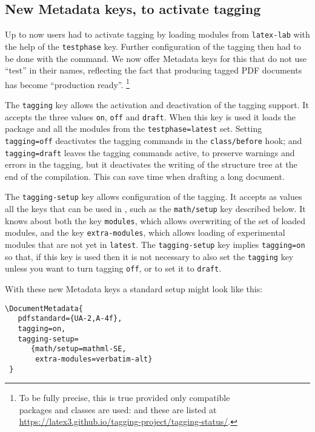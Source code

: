 \documentclass{ltnews}
\begin{document}
\subsection{New Metadata keys, to activate tagging}

Up to now users had to activate tagging by loading modules from
\texttt{latex-lab} with the help of the \texttt{testphase}
key. Further configuration of the tagging then had to be done with the
 command.  We now offer Metadata keys for this 
that do not use
\enquote{test} in their names, reflecting the fact that producing
tagged PDF documents has become \enquote{production ready}.%
\footnote{To be fully precise, this is true provided
only compatible\\
packages and classes are used: and these are listed at\\
\url{https://latex3.github.io/tagging-project/tagging-status/}.}

The \texttt{tagging} key allows the activation and deactivation of the tagging
support.  It accepts the three values \texttt{on}, \texttt{off} and
\texttt{draft}.  When this key is used it loads the
 package and all the modules from the
\texttt{testphase=latest} set.  Setting \texttt{tagging=off} deactivates the
tagging commands in the 
\texttt{class/before} hook; and \texttt{tagging=draft} leaves the 
tagging commands active, to 
preserve warnings and errors in the tagging, but it deactivates
the writing of the structure tree at the end of the compilation. This
can save time when drafting a long document.

The \texttt{tagging-setup} key allows configuration of the tagging. It
accepts as values all the keys that can be used in ,
such as the \texttt{math/setup} key described below. It knows about both the
key \texttt{modules}, which allows overwriting of the set of loaded
modules, and the key \texttt{extra-modules}, which allows loading of
experimental modules that are not yet in \texttt{latest}. 
%
The \texttt{tagging-setup} key implies \texttt{tagging=on} so that, if
this key is used then it is not necessary to also set the \texttt{tagging}
key unless you want to turn tagging \texttt{off}, or to set it to
\texttt{draft}.

With these new Metadata keys a standard setup might look like this:
\begin{verbatim}
\DocumentMetadata{
   pdfstandard={UA-2,A-4f},
   tagging=on,
   tagging-setup=
      {math/setup=mathml-SE,
       extra-modules=verbatim-alt}
 }      
\end{verbatim}
\end{document}
